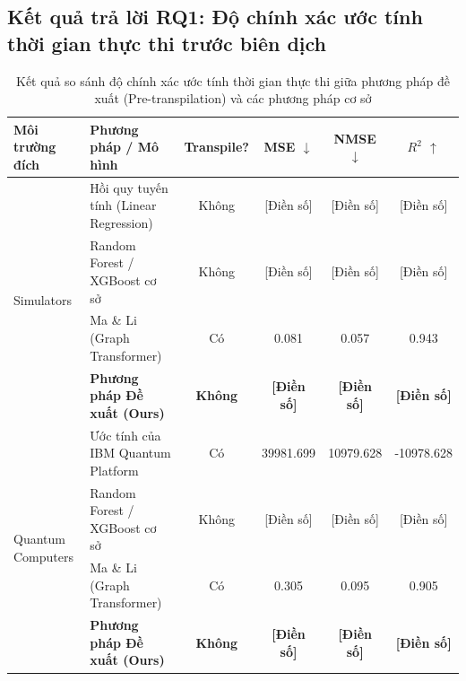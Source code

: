 \documentclass[11pt, a4paper]{article}
\begin{document}
\subsection{Kết quả trả lời RQ1: Độ chính xác ước tính thời gian thực thi trước biên dịch}

\noindent{}

\begin{table}[htbp]
\centering
\caption{Kết quả so sánh độ chính xác ước tính thời gian thực thi giữa phương pháp đề xuất (Pre-transpilation) và các phương pháp cơ sở}
\label{tab:rq1_results}
\begin{tabularx}{\textwidth}{l X c c c c}
\toprule
\textbf{Môi trường đích} & \textbf{Phương pháp / Mô hình} & \textbf{Transpile?} & \textbf{MSE $\downarrow$} & \textbf{NMSE $\downarrow$} & \textbf{$R^2$ $\uparrow$} \\
\midrule
\multirow{4}{*}{Simulators} 
 & Hồi quy tuyến tính (Linear Regression) & Không & [Điền số] & [Điền số] & [Điền số] \\
 & Random Forest / XGBoost cơ sở & Không & [Điền số] & [Điền số] & [Điền số] \\
 & Ma \& Li (Graph Transformer) \cite{ma2025understanding} & Có & 0.081 & 0.057 & 0.943 \\
 & \textbf{Phương pháp Đề xuất (Ours)} & \textbf{Không} & \textbf{[Điền số]} & \textbf{[Điền số]} & \textbf{[Điền số]} \\
\midrule
\multirow{4}{*}{Quantum Computers} 
 & Ước tính của IBM Quantum Platform & Có & 39981.699 & 10979.628 & -10978.628 \\
 & Random Forest / XGBoost cơ sở & Không & [Điền số] & [Điền số] & [Điền số] \\
 & Ma \& Li (Graph Transformer) \cite{ma2025understanding} & Có & 0.305 & 0.095 & 0.905 \\
 & \textbf{Phương pháp Đề xuất (Ours)} & \textbf{Không} & \textbf{[Điền số]} & \textbf{[Điền số]} & \textbf{[Điền số]} \\
\bottomrule
\end{tabularx}
\end{table}
\end{document}
